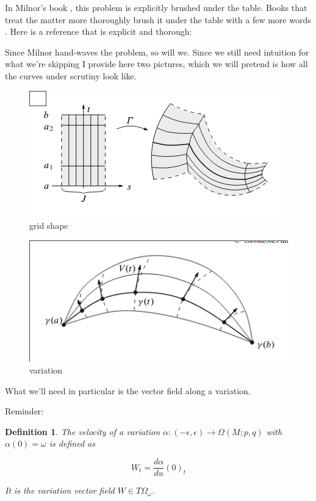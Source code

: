 \documentclass{article}
\newtheorem{def}{Definition}
\begin{document}
In Milnor's book \cite{milnor}, this problem is explicitly brushed under the table.
Books that treat the matter more thoroughly brush it under the table with a few more words
\cite{salamon}.
Here is a reference that is explicit and thorough: \cite{lee}

Since Milnor hand-waves the problem, so will we. Since we still need intuition for what we're
skipping I provide here two pictures, which we will pretend is how all the curves under scrutiny
look like.

\begin{figure}
    \includegraphics{img/grid.png}
    \caption{grid shape}
    \label{fig:boat1}
\end{figure}
\begin{figure}
    \includegraphics{img/sail.png}
    \caption{variation}
    \label{fig:boat1}
\end{figure}



What we'll need in particular is the vector field along a variation.

Reminder:

\begin{def}
\label{def:vel_of_var}
    The velocity of a variation $\alpha: (-\epsilon, \epsilon) \rightarrow \Omega(M;p,q)$ with
    $\alpha(0) = \omega$ is defined as

    \[ W_t = \frac{d\alpha}{du}(0)_t \]

    It is the variation vector field $W \in T\Omega_{\omega}$.
\end{def}
\end{document}
